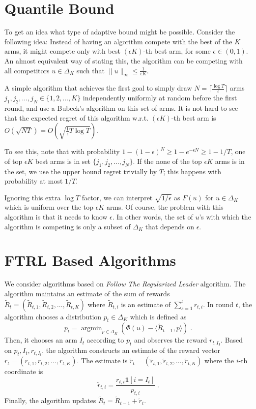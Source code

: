 \documentclass{article}
\newcommand{\norm}[1]{\|#1\|}
\newcommand{\indicator}{\mathbf{1}}
\DeclareMathOperator{\argmin}{argmin}
\begin{document}
\section{Quantile Bound}

To get an idea what type of adaptive bound might be possible. Consider the
following idea: Instead of having an algorithm compete with the best of the $K$
arms, it might compete only with best $(\epsilon K)$-th best arm, for some
$\epsilon \in (0,1)$. An almost equivalent way of stating this, the algorithm
can be competing with all competitors $u \in \Delta_K$ such that
$\norm{u}_\infty \le \frac{1}{\epsilon K}$.

A simple algorithm that achieves the first goal to simply draw $N =
\lceil \frac{\log T}{\epsilon} \rceil$ arms $j_1, j_2, \dots, j_N \in \{1,2, \dots, K\}$
independently uniformly at random before the first round, and use a Bubeck's
algorithm on this set of arms. It is not hard to see that the expected regret
of this algorithm w.r.t. $(\epsilon K)$-th best arm is
$O(\sqrt{N T}) = O \left(\sqrt{\frac{1}{\epsilon} T \log T} \right)$.

To see this, note that with probability $1 - (1-\epsilon)^N \ge 1 -
e^{-\epsilon N} \ge 1 - 1/T$, one of top $\epsilon K$ best arms is in set
$\{j_1, j_2, \dots, j_N\}$.  If the none of the top $\epsilon K$ arms is in the
set, we use the upper bound regret trivially by $T$; this happens with
probability at most $1/T$.

Ignoring this extra $\log T$ factor, we can interpret $\sqrt{1/\epsilon}$ as
$F(u)$ for $u \in \Delta_K$ which is uniform over the top $\epsilon K$ arms.
Of course, the problem with this algorithm is that it needs to know $\epsilon$.
In other words, the set of $u$'s with which the algorithm is competing is only
a subset of $\Delta_K$ that depends on $\epsilon$.

\section{FTRL Based Algorithms}

We consider algorithms based on \emph{Follow The Regularized Leader} algorithm.
The algorithm maintains an estimate of the sum of rewards $\widetilde R_t =
(\widetilde R_{t,1}, \widetilde R_{t,2}, \dots, \widetilde R_{t,K})$ where $\widetilde R_{t,i}$
is an estimate of $\sum_{s=1}^t r_{t,i}$.
In round $t$, the algorithm chooses a distribution $p_t \in \Delta_K$ which
is defined as
$$
p_t = \argmin_{p \in \Delta_K} \left( \Phi(u) - \langle \widetilde R_{t-1}, p \rangle \right) \; .
$$
Then, it chooses an arm $I_t$ according to $p_t$ and observes the reward $r_{t,I_I}$.
Based on $p_t, I_t, r_{t,I_t}$, the algorithm constructs an estimate of the reward vector $r_t = (r_{t,1}, r_{t,2}, \dots, r_{t,K})$.
The estimate is $\widetilde r_t = (\widetilde r_{t,1}, \widetilde r_{t,2}, \dots, \widetilde r_{t,K})$
where the $i$-th coordinate is
$$
\widetilde r_{t,i} = \frac{r_{t,i} \indicator[i=I_t]}{p_{t,i}}  \; .
$$
Finally, the algorithm updates $\widetilde R_t = \widetilde R_{t-1} + \widetilde r_t$.
\end{document}

